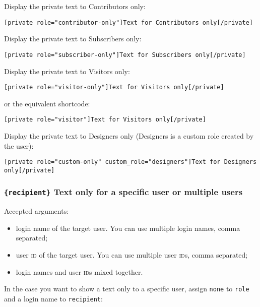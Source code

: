Display the private text to Contributors only:

\begin{lstlisting}
[private role="contributor-only"]Text for Contributors only[/private]
\end{lstlisting}

Display the private text to Subscribers only:

\begin{lstlisting}
[private role="subscriber-only"]Text for Subscribers only[/private]
\end{lstlisting}

Display the private text to Visitors only:

\begin{lstlisting}
[private role="visitor-only"]Text for Visitors only[/private]
\end{lstlisting}

or the equivalent shortcode:

\begin{lstlisting}
[private role="visitor"]Text for Visitors only[/private]
\end{lstlisting}

Display the private text to Designers only (Designers is a custom role created
by the user):

\begin{lstlisting}
[private role="custom-only" custom_role="designers"]Text for Designers only[/private]
\end{lstlisting}

\subsubsection{\texttt{\{recipient\}} Text only for a specific user or multiple users}

Accepted arguments:

\begin{itemize}
  \item login name of the target user. You can use multiple login names, comma
  separated;
  \item user \textsc{id} of the target user. You can use multiple user
  \textsc{id}s, comma separated;
  \item login names and user \textsc{id}s mixed together.
\end{itemize}

In the case you want to show a text only to a specific user, assign \verb+none+
to \verb+role+ and a login name to \verb+recipient+:

